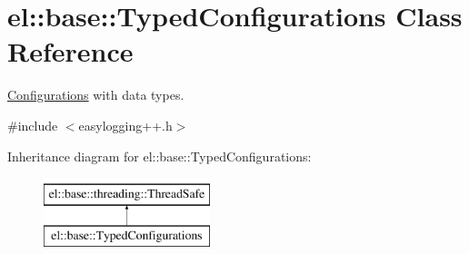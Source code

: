 \hypertarget{classel_1_1base_1_1TypedConfigurations}{\section{el\-:\-:base\-:\-:Typed\-Configurations Class Reference}
\label{classel_1_1base_1_1TypedConfigurations}
}


\hyperlink{classel_1_1Configurations}{Configurations} with data types.  




{\ttfamily \#include $<$easylogging++.\-h$>$}

Inheritance diagram for el\-:\-:base\-:\-:Typed\-Configurations\-:\begin{figure}[H]
\begin{center}
\leavevmode
\includegraphics[height=2.000000cm]{classel_1_1base_1_1TypedConfigurations}
\end{center}
\end{figure}
